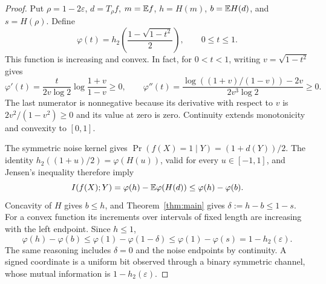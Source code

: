 \begin{proof}
Put $\rho=1-2\varepsilon$, $d=T_\rho f$, $m=\mathbb E f$,
$h=H(m)$, $b=\mathbb E H(d)$, and $s=H(\rho)$. Define
\[
 \varphi(t)=h_2\left(\frac{1-\sqrt{1-t^2}}2\right),\qquad 0\le t\le1.
\]
This function is increasing and convex. In fact, for $0<t<1$,
writing $v=\sqrt{1-t^2}$ gives
\[
 \varphi'(t)=\frac{t}{2v\log 2}\log\frac{1+v}{1-v}\ge0,
 \qquad
 \varphi''(t)=\frac{\log((1+v)/(1-v))-2v}{2v^3\log 2}\ge0.
\]
The last numerator is nonnegative because its derivative with respect
to $v$ is $2v^2/(1-v^2)\ge0$ and its value at zero is zero.
Continuity extends monotonicity and convexity to $[0,1]$.

The symmetric noise kernel gives
$\Pr(f(X)=1\mid Y)=(1+d(Y))/2$. The identity
$h_2((1+u)/2)=\varphi(H(u))$, valid for every $u\in[-1,1]$, and
Jensen's inequality therefore imply
\[
 I(f(X);Y)=\varphi(h)-\mathbb E\varphi(H(d))
 \le\varphi(h)-\varphi(b).
\]
Concavity of $H$ gives $b\le h$, and Theorem~\ref{thm:main} gives
$\delta:=h-b\le1-s$. For a convex function its increments over intervals
of fixed length are increasing with the left endpoint. Since $h\le1$,
\[
 \varphi(h)-\varphi(b)
 \le\varphi(1)-\varphi(1-\delta)
 \le\varphi(1)-\varphi(s)
 =1-h_2(\varepsilon).
\]
The same reasoning includes $\delta=0$ and the noise endpoints by
continuity. A signed coordinate is a uniform bit observed through a
binary symmetric channel, whose mutual information is
$1-h_2(\varepsilon)$.
\end{proof}

